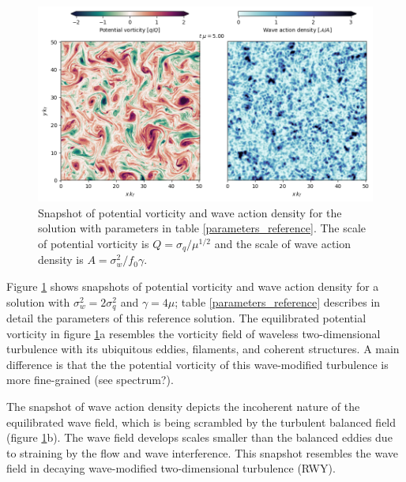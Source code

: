 \documentclass[12pt]{article}
\begin{document}
\begin{figure}
\centering
\includegraphics[width=.925\textwidth]{figs/snapshots_pv_qg-niw_reference.png}
\caption{Snapshot of potential vorticity and wave action density for the solution
         with parameters in  table \ref{parameters_reference}. The scale of potential vorticity
         is $Q = \sigma_q/\mu^{1/2} $ and the scale of wave action density is
         $A = \sigma_w^2/f_0 \gamma$.}
        \label{snapshots_pv_qg-niw_reference}
\end{figure}

Figure \ref{snapshots_pv_qg-niw_reference} shows snapshots of potential vorticity and wave
action density for a solution with $\sigma_w^2 = 2\sigma_q^2$ and $\gamma = 4\mu$; table
\ref{parameters_reference} describes in detail the parameters of
this reference solution. The equilibrated potential vorticity in figure
\ref{snapshots_pv_qg-niw_reference}a  resembles the vorticity field
of waveless two-dimensional turbulence with its ubiquitous eddies, filaments,
and coherent structures. A main difference is that the the potential vorticity
of this wave-modified turbulence is more fine-grained (see spectrum?).

The snapshot of wave action density depicts the incoherent nature of the equilibrated
wave field, which is being scrambled by the turbulent balanced field
(figure \ref{snapshots_pv_qg-niw_reference}b). The wave field develops scales smaller
than the balanced eddies due to straining by the flow and wave interference.
This snapshot resembles the wave field in decaying wave-modified
two-dimensional turbulence (RWY).
\end{document}

